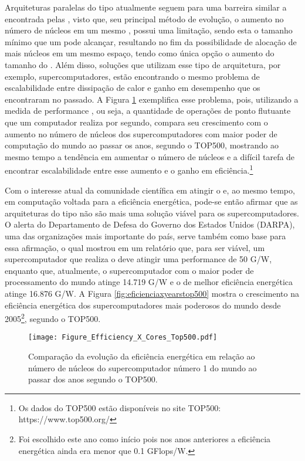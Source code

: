 Arquiteturas paralelas do tipo \multicore atualmente seguem para uma barreira similar a encontrada pelas \singlecore, visto que, seu principal método de evolução, o aumento no número de núcleos em um mesmo \chip, possui uma limitação, sendo esta o tamanho mínimo que um \transistor pode alcançar, resultando no fim da possibilidade de alocação de mais núcleos em um mesmo espaço, tendo como única opção o aumento do tamanho do \chip. Além disso, soluções que utilizam esse tipo de arquitetura, por exemplo, supercomputadores, estão encontrando o mesmo problema de escalabilidade entre dissipação de calor e ganho em desempenho que os \singlecore encontraram no passado. A Figura \ref{fig:eficienciaxcorestop500} exemplifica esse problema, pois, utilizando a medida de performance \Flops, ou seja, a quantidade de operações de ponto flutuante que um computador realiza por segundo, compara seu crescimento com o aumento no número de núcleos dos supercomputadores com maior poder de computação do mundo ao passar os anos, segundo o \ranking TOP500, mostrando ao mesmo tempo a tendência em aumentar o número de núcleos e a difícil tarefa de encontrar escalabilidade entre esse aumento e o ganho em eficiência.\footnote{Os dados do \ranking TOP500 estão disponíveis no site TOP500: https://www.top500.org/}

Com o interesse atual da comunidade científica em atingir o \exascale e, ao mesmo tempo, em computação voltada para a eficiência energética, pode-se então afirmar que as arquiteturas do tipo \multicore não são mais uma solução viável para os supercomputadores. O alerta do Departamento de Defesa do Governo dos Estados Unidos (DARPA), uma das organizações mais importante do país, serve também como base para essa afirmação, o qual mostrou em um relatório \cite{darpa:exascale} que, para ser viável, um supercomputador que realiza o \exascale deve atingir uma performance de 50 G\Flops/W, enquanto que, atualmente, o supercomputador com o maior poder de processamento do mundo atinge 14.719 G\Flops/W e o de melhor eficiência energética atinge 16.876 G\Flops/W. A Figura \ref{fig:eficienciaxyearstop500} mostra o crescimento na eficiência energética dos supercomputadores mais poderosos do mundo desde 2005\footnote{Foi escolhido este ano como início pois nos anos anteriores a eficiência energética ainda era menor que 0.1 GFlops/W.}, segundo o \ranking TOP500.

\begin{figure}[tb]
  \centering
  \caption{Comparação da evolução da eficiência energética em relação ao número de núcleos do supercomputador número 1 do mundo ao passar dos anos segundo o \ranking TOP500.}
  \label{fig:eficienciaxcorestop500}
  \texttt{[image: Figure\_Efficiency\_X\_Cores\_Top500.pdf]}
\end{figure}

